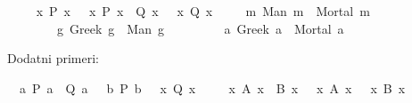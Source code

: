 \begin{isabellebody}
\begin{exercise}[subtitle=Dokazi u prirodnoj dedukciji]
\ \ %
\isadelimproof
%
\endisadelimproof
%
\isatagproof
%
\endisatagproof
{\isafoldproof}%
%
\isadelimproof
%
\endisadelimproof
\isanewline
{}\isamarkupfalse%
\ {\isachardoublequoteopen}{\isacharparenleft}{\kern0pt}{\isasymexists}\ x{\isachardot}{\kern0pt}\ P\ x{\isacharparenright}{\kern0pt}\ {\isasymand}\ {\isacharparenleft}{\kern0pt}{\isasymforall}\ x{\isachardot}{\kern0pt}\ P\ x\ {\isasymlongrightarrow}\ Q\ x{\isacharparenright}{\kern0pt}\ {\isasymlongrightarrow}\ {\isacharparenleft}{\kern0pt}{\isasymexists}\ x{\isachardot}{\kern0pt}\ Q\ x{\isacharparenright}{\kern0pt}{\isachardoublequoteclose}\isanewline
\ \ %
\isadelimproof
%
\endisadelimproof
%
\isatagproof
%
\endisatagproof
{\isafoldproof}%
%
\isadelimproof
%
\endisadelimproof
\isanewline
{}\isamarkupfalse%
\ {\isachardoublequoteopen}{\isacharparenleft}{\kern0pt}{\isasymforall}\ m{\isachardot}{\kern0pt}\ Man\ m\ {\isasymlongrightarrow}\ Mortal\ m{\isacharparenright}{\kern0pt}\ {\isasymand}\ \isanewline
\ \ \ \ \ \ \ {\isacharparenleft}{\kern0pt}{\isasymforall}\ g{\isachardot}{\kern0pt}\ Greek\ g\ {\isasymlongrightarrow}\ Man\ g{\isacharparenright}{\kern0pt}\ {\isasymlongrightarrow}\isanewline
\ \ \ \ \ \ \ {\isacharparenleft}{\kern0pt}{\isasymforall}\ a{\isachardot}{\kern0pt}\ Greek\ a\ {\isasymlongrightarrow}\ Mortal\ a{\isacharparenright}{\kern0pt}{\isachardoublequoteclose}\isanewline
\ \ %
\isadelimproof
%
\endisadelimproof
%
\isatagproof
%
\endisatagproof
{\isafoldproof}%
%
\isadelimproof
%
\endisadelimproof
%
\begin{isamarkuptext}%
Dodatni primeri:%
\end{isamarkuptext}\isamarkuptrue%
\isamarkupfalse%
\ {\isachardoublequoteopen}{\isacharparenleft}{\kern0pt}{\isasymforall}\ a{\isachardot}{\kern0pt}\ P\ a\ {\isasymlongrightarrow}\ Q\ a{\isacharparenright}{\kern0pt}\ {\isasymand}\ {\isacharparenleft}{\kern0pt}{\isasymforall}\ b{\isachardot}{\kern0pt}\ P\ b{\isacharparenright}{\kern0pt}\ {\isasymlongrightarrow}\ {\isacharparenleft}{\kern0pt}{\isasymforall}\ x{\isachardot}{\kern0pt}\ Q\ x{\isacharparenright}{\kern0pt}{\isachardoublequoteclose}\isanewline
\ \ %
\isadelimproof
%
\endisadelimproof
%
\isatagproof
%
\endisatagproof
{\isafoldproof}%
%
\isadelimproof
%
\endisadelimproof
\isanewline
{}\isamarkupfalse%
\ {\isachardoublequoteopen}{\isacharparenleft}{\kern0pt}{\isasymexists}\ x{\isachardot}{\kern0pt}\ A\ x\ {\isasymor}\ B\ x{\isacharparenright}{\kern0pt}\ {\isasymlongrightarrow}\ {\isacharparenleft}{\kern0pt}{\isasymexists}\ x{\isachardot}{\kern0pt}\ A\ x{\isacharparenright}{\kern0pt}\ {\isasymor}\ {\isacharparenleft}{\kern0pt}{\isasymexists}\ x{\isachardot}{\kern0pt}\ B\ x{\isacharparenright}{\kern0pt}{\isachardoublequoteclose}\isanewline

\end{exercise}
\end{isabellebody}
